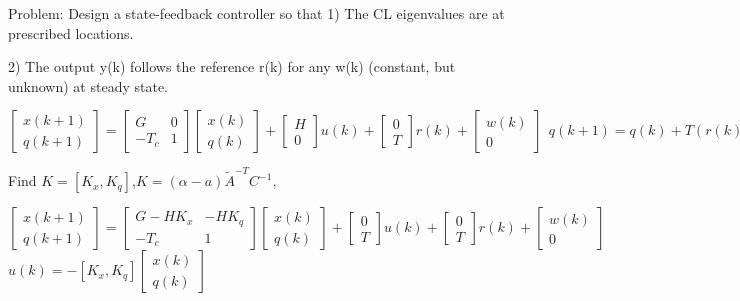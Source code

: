 Problem: Design a state-feedback controller so that
1) The CL eigenvalues are at prescribed locations.

2) The output y(k) follows the reference r(k) for any w(k)
(constant, but unknown) at steady state.

$
 \begin{bmatrix} x(k+1) \\ q(k+1)\end{bmatrix} =
\begin{bmatrix}G & 0 \\ -T_c & 1\end{bmatrix}\begin{bmatrix}x(k) \\ q(k)\end{bmatrix}+
\begin{bmatrix}H \\ 0\end{bmatrix}u(k)+\begin{bmatrix} 0 \\ T\end{bmatrix}r(k)+\begin{bmatrix}w(k) \\ 0\end{bmatrix} \ \
q(k+1)=q(k)+T(r(k)-y(k)) 
$

Find $K = [K_x, K_q]$,$K=(\alpha-a)\tilde{A}^{-T}C^{-1}$,

$ \begin{bmatrix} x(k+1) \\ q(k+1)\end{bmatrix} =
\begin{bmatrix}G-HK_x & -HK_q \\ -T_c & 1\end{bmatrix}\begin{bmatrix}x(k) \\ q(k)\end{bmatrix}+
\begin{bmatrix}0 \\ T\end{bmatrix}u(k)+\begin{bmatrix} 0 \\ T\end{bmatrix}r(k)+\begin{bmatrix}w(k) \\ 0\end{bmatrix}$ $u(k)=-[K_x, K_q]\begin{bmatrix} x(k) \\ q(k)
\end{bmatrix}$ %


